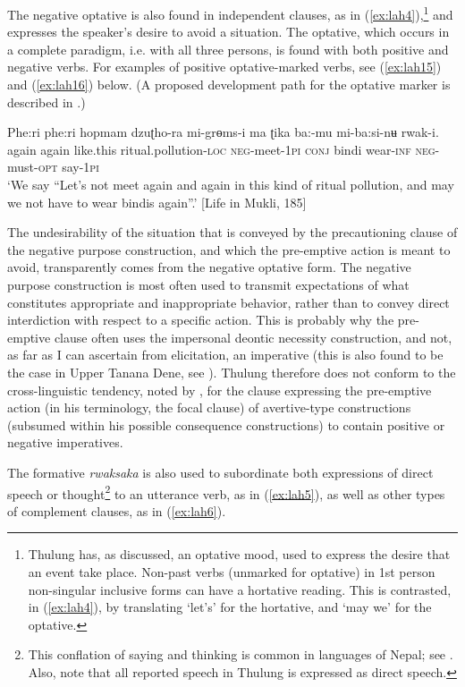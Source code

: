 \documentclass[output=paper,colorlinks,citecolor=brown,
]{langscibook}
\begin{document}
The negative optative is also found in independent clauses, as in (\ref{ex:lah4}),\footnote{Thulung has, as discussed, an optative mood, used to express the desire that an event take place. Non-past verbs (unmarked for optative) in 1st person non-singular inclusive forms can have a hortative reading. This is contrasted, in (\ref{ex:lah4}), by translating `let's' for the hortative, and `may we' for the optative.} and expresses the speaker's desire to avoid a situation. The optative, which occurs in a complete paradigm, i.e. with all three persons, is found with both positive and negative verbs. For examples of positive optative-marked verbs, see 
(\ref{ex:lah15}) and (\ref{ex:lah16}) below. (A proposed development path for the optative marker is described in .)


\ea
\label{ex:lah4}
\gll Phe:ri phe:ri hopmam dzuʈho{}-ra mi{}-grɵms-i ma ʈika ba:-mu mi-ba:si-nʉ  rwak-i. \\
again again like.this ritual.pollution\textsc{-loc}  \textsc{neg}-meet-\textsc{1pi} \textsc{conj} bindi wear-\textsc{inf} \textsc{neg}-must-\textsc{opt} say-\textsc{1pi} \\
\glt `We say ``Let's not meet again and again in this kind of ritual pollution, and may we not have to wear bindis again''.' [Life in Mukli, 185]
\z


The undesirability of the situation that is conveyed by the precautioning clause of the negative purpose construction, and which the pre-emptive action is meant to avoid, transparently comes from the negative optative form. The negative purpose construction is most often used to transmit expectations of what constitutes appropriate and inappropriate behavior, rather than to convey direct interdiction with respect to a specific action. This is probably why the pre-emptive clause often uses the impersonal deontic necessity construction, and not, as far as I can ascertain from elicitation, an imperative (this is also found to be the case in Upper Tanana Dene, see \citealt{chapters/lovick}). Thulung therefore does not conform to the cross-linguistic tendency, noted by \citet[24]{dixon2009}, for the clause expressing the pre-emptive action (in his terminology, the focal clause) of avertive-type constructions (subsumed within his possible consequence constructions) to contain positive or negative imperatives.

The formative \textit{rwaksaka} is also used to subordinate both expressions of direct speech or thought\footnote{This conflation of saying and thinking is common in languages of Nepal; see \citet{Noonan2006}. Also, note that all reported speech in Thulung is expressed as direct speech.} to an utterance verb, as in (\ref{ex:lah5}), as well as other types of complement clauses, as in (\ref{ex:lah6}).
\end{document}
